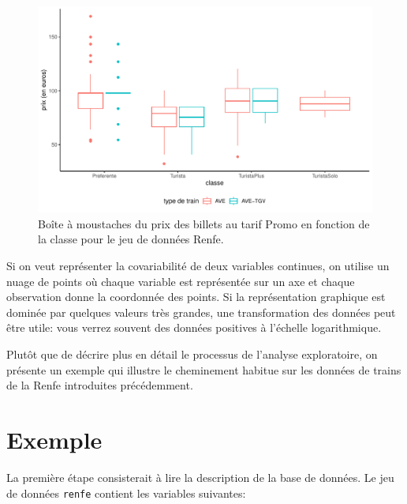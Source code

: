 \documentclass[
  11pt,
  letterpaper,
]{scrbook}
\theoremstyle{definition}
\theoremstyle{remark}
\begin{document}
\begin{figure}[ht!]

{\centering \includegraphics[width=1\textwidth,height=\textheight]{./01-analyseexploratoire_files/figure-pdf/fig-histboxplot-1.pdf}

}

\caption{\label{fig-histboxplot}Boîte à moustaches du prix des billets
au tarif Promo en fonction de la classe pour le jeu de données Renfe.}

\end{figure}

Si on veut représenter la covariabilité de deux variables continues, on
utilise un nuage de points où chaque variable est représentée sur un axe
et chaque observation donne la coordonnée des points. Si la
représentation graphique est dominée par quelques valeurs très grandes,
une transformation des données peut être utile: vous verrez souvent des
données positives à l'échelle logarithmique.

Plutôt que de décrire plus en détail le processus de l'analyse
exploratoire, on présente un exemple qui illustre le cheminement habitue
sur les données de trains de la Renfe introduites précédemment.

\hypertarget{exemple}{%
\section{Exemple}\label{exemple}}

La première étape consisterait à lire la description de la base de
données. Le jeu de données \texttt{renfe} contient les variables
suivantes:
\end{document}
